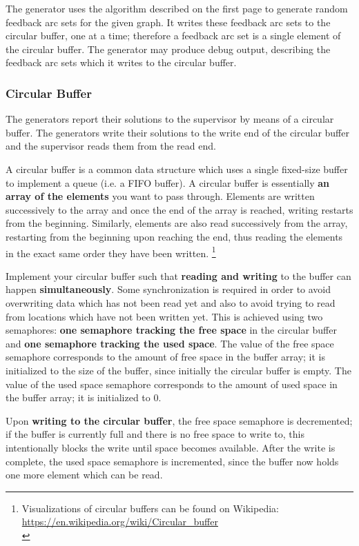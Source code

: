 The generator uses the algorithm described on the first page
to generate random feedback arc sets for the given graph.
It writes these feedback arc sets to the circular buffer, one at a time;
therefore a feedback arc set is a single element of the circular buffer.
The generator may produce debug output,
describing the feedback arc sets which it writes to the circular buffer.

\clearpage
\subsubsection*{Circular Buffer}

The generators report their solutions to the supervisor by means of a circular buffer.
The generators write their solutions to the write end of the circular buffer
and the supervisor reads them from the read end.

A circular buffer is a common data structure which uses a single fixed-size buffer
to implement a queue (i.e. a FIFO buffer).
A circular buffer is essentially \textbf{an array of the elements} you want to pass through.
Elements are written successively to the array
and once the end of the array is reached, writing restarts from the beginning.
Similarly, elements are also read successively from the array,
restarting from the beginning upon reaching the end,
thus reading the elements in the exact same order they have been written.
\footnote{
Visualizations of circular buffers can be found on Wikipedia:\\
\url{https://en.wikipedia.org/wiki/Circular_buffer}\\
}

Implement your circular buffer such that \textbf{reading and writing} to the buffer
can happen \textbf{simultaneously}.
Some synchronization is required
in order to avoid overwriting data which has not been read yet
and also to avoid trying to read from locations which have not been written yet.
This is achieved using two semaphores:
\textbf{one semaphore tracking the free space} in the circular buffer
and \textbf{one semaphore tracking the used space}.
The value of the free space semaphore corresponds to the amount of free space in the buffer array;
it is initialized to the size of the buffer, since initially the circular buffer is empty.
The value of the used space semaphore corresponds to the amount of used space in the buffer array;
it is initialized to 0.

Upon \textbf{writing to the circular buffer}, the free space semaphore is decremented;
if the buffer is currently full and there is no free space to write to,
this intentionally blocks the write until space becomes available.
After the write is complete, the used space semaphore is incremented,
since the buffer now holds one more element which can be read.

